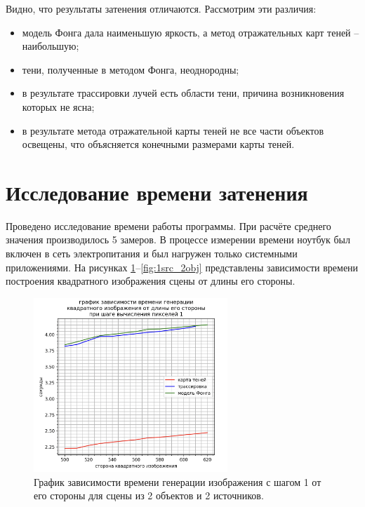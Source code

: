 Видно, что результаты затенения отличаются.
Рассмотрим эти различия:
\begin{itemize}
    \item
        модель Фонга дала наименьшую яркость,
        а метод отражательных карт теней -- наибольшую;
    \item тени, полученные в методом Фонга, неоднородны;
    \item
        в результате трассировки лучей есть области тени,
        причина возникновения которых не ясна;
    \item
        в результате метода отражательной карты теней
        не все части объектов освещены,
        что объясняется конечными размерами карты теней.
\end{itemize}

\section{Исследование времени затенения}
Проведено исследование времени работы программы.
При расчёте среднего значения производилось 5 замеров.
В процессе измерении времени ноутбук был включен в сеть электропитания
и был нагружен только системными приложениями.
На рисунках \ref{fig:2src_2obj}--\ref{fig:1src_2obj} представлены зависимости
времени построения квадратного изображения сцены от длины его стороны.

\begin{figure}[H]
	\centering
	\includegraphics[width=0.65\textwidth]{img/2src_2obj.png}
	\caption{
        График зависимости времени генерации изображения с шагом 1 от его стороны
        для сцены из 2 объектов и 2 источников.
    }
	\label{fig:2src_2obj}
\end{figure}

